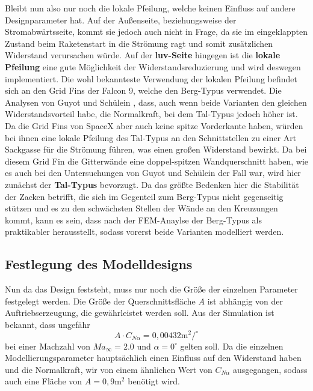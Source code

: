 Bleibt nun also nur noch die lokale Pfeilung, welche keinen Einfluss auf andere Designparameter hat. Auf der Außenseite, beziehungsweise der Stromabwärtsseite, kommt sie jedoch auch nicht in Frage, da sie im eingeklappten Zustand beim Raketenstart in die Strömung ragt und somit zusätzlichen Widerstand verursachen würde. Auf der \textbf{luv-Seite} hingegen ist die \textbf{lokale Pfeilung} eine gute Möglichkeit der Widerstandsreduzierung und wird deswegen implementiert. Die wohl bekannteste Verwendung der lokalen Pfeilung befindet sich an den Grid Fins der Falcon 9, welche den Berg-Typus verwendet. Die Analysen von Guyot und Schülein \cite{PeakValley}, dass, auch wenn beide Varianten den gleichen Widerstandsvorteil habe, die Normalkraft, bei dem Tal-Typus jedoch höher ist. Da die Grid Fins von SpaceX aber auch keine spitze Vorderkante haben, würden bei ihnen eine lokale Pfeilung des Tal-Typus an den Schnittstellen zu einer Art Sackgasse für die Strömung führen, was einen großen Widerstand bewirkt. Da bei diesem Grid Fin die Gitterwände eine doppel-spitzen Wandquerschnitt haben, wie es auch bei den Untersuchungen von Guyot und Schülein der Fall war, wird hier zunächst der \textbf{Tal-Typus} bevorzugt. Da das größte Bedenken hier die Stabilität der Zacken betrifft, die sich im Gegenteil zum Berg-Typus nicht gegenseitig stützen und es zu den schwächsten Stellen der Wände an den Kreuzungen kommt, kann es sein, dass nach der FEM-Anaylse der Berg-Typus als praktikabler herausstellt, sodass vorerst beide Varianten modelliert werden.
\subsection{Festlegung des Modelldesigns}\label{sec:modelldesign}
Nun da das Design feststeht, muss nur noch die Größe der einzelnen Parameter festgelegt werden. Die Größe der Querschnittsfläche $A$ ist abhängig von der Auftriebserzeugung, die gewährleistet werden soll. Aus der Simulation ist bekannt, dass ungefähr
\begin{equation}
	A \cdot C_{N\alpha}= 0,00432 \mathrm{m}^2/^\circ
\end{equation}
bei einer Machzahl von $Ma_\infty = 2.0$ und $\alpha = 0^\circ$ gelten soll. Da die einzelnen Modellierungsparameter hauptsächlich einen Einfluss auf den Widerstand haben und die Normalkraft, wir von einem ähnlichen Wert von $C_{N\alpha}$ ausgegangen, sodass auch eine Fläche von $A=0,9\mathrm{m}^2$ benötigt wird.

